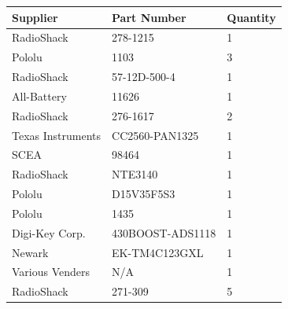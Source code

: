 \documentclass[11pt]{report}
\begin{document}
\begin{spacing}{1.5}
\begin{table}[H]
\begin{tabular}{lll}
\toprule

Supplier & Part Number & Quantity \\
\midrule
RadioShack & 278-1215 & 1 \\
Pololu & 	1103	 & 3 \\
RadioShack & 57-12D-500-4 & 	1 \\
All-Battery & 	11626	 & 1 \\
RadioShack & 276-1617 & 2 \\
Texas Instruments & 	CC2560-PAN1325 & 	1 \\
SCEA & 	98464	 & 1 \\
RadioShack & NTE3140 & 1 \\
Pololu & 	 D15V35F5S3	 & 1 \\
Pololu & 	1435	 & 1 \\
Digi-Key Corp. & 	430BOOST-ADS1118 & 	1 \\
Newark & 	 EK-TM4C123GXL	 & 1 \\
Various Venders & 	N/A & 	1 \\
RadioShack & 271-309 & 5 \\
 \bottomrule
\end{tabular}
\end{table}



\end{spacing}
\end{document}
